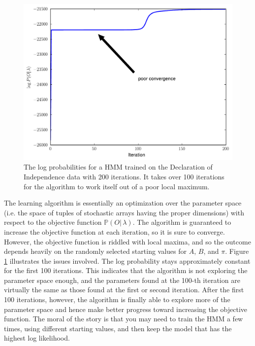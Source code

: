 \begin{figure}
\centering
\includegraphics[width=\textwidth]{logProbs.pdf}
\caption{The log probabilities for a HMM trained on the Declaration of Independence
data with 200 iterations. It takes over 100 iterations for the algorithm to work itself out
of a poor local maximum.}
\label{fig:logprobs}
\end{figure}


The learning algorithm is essentially an optimization over the parameter space (i.e. the space of tuples of
stochastic arrays having the proper dimensions) with respect to the objective function $\mathbb{P}(O |\, \lambda)$.
The algorithm is guaranteed to increase the objective function at each iteration, so it is sure to converge.
However, the objective function is riddled with local maxima, and so the outcome depends heavily on the randomly
selected starting values for $A$, $B$, and $\pi$. Figure \ref{fig:logprobs} illustrates the issues involved.
The log probability stays approximately constant for the first 100
iterations. This indicates that the algorithm is not exploring the parameter space enough, and the parameters
found at the 100-th iteration are virtually the same as those found at the first or second iteration. After the first
100 iterations, however, the algorithm is finally able to explore more of the parameter space and hence make
better progress toward increasing the objective function. The moral of the story is that you may need to train
the HMM a few times, using different starting values, and then keep the model that has the highest log likelihood.



